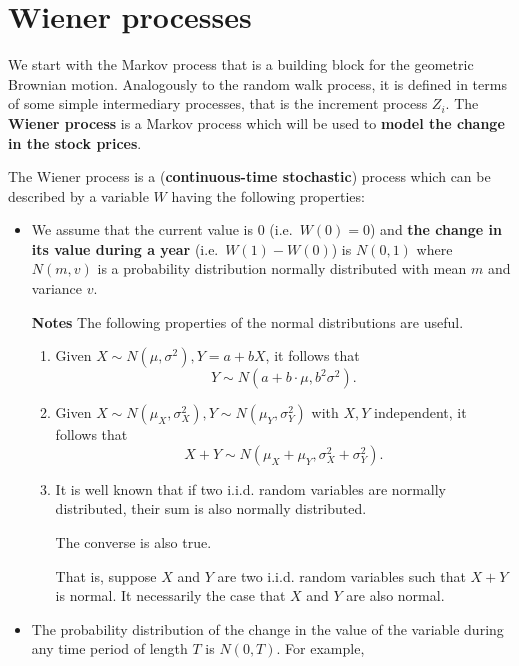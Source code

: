 \documentclass[
]{book}
\theoremstyle{definition}
\theoremstyle{definition}
\theoremstyle{definition}
\theoremstyle{definition}
\theoremstyle{remark}
\begin{document}
\hypertarget{wiener-processes}{%
\section{Wiener processes}\label{wiener-processes}}

We start with the Markov process that is a building block for the
geometric Brownian motion. Analogously to the random walk process, it is
defined in terms of some simple intermediary processes, that is the
increment process \(Z_i\). The \textbf{Wiener process} is a Markov process
which will be used to \textbf{model the change in the stock prices}.

The Wiener process is a (\textbf{continuous-time stochastic}) process which
can be described by a variable \(W\) having the following properties:

\begin{itemize}
\item
  We assume that the current value is 0 (i.e.~\(W(0) = 0\)) and \textbf{the
  change in its value during a year} (i.e.~\(W(1) - W(0)\)) is \(N(0,1)\)
  where \(N(m,v)\) is a probability distribution normally distributed
  with mean \(m\) and variance \(v\).

  \textbf{Notes} The following properties of the normal distributions are
  useful.

  \begin{enumerate}
  \def\labelenumi{\arabic{enumi}.}
  \item
    Given \(X \sim N(\mu, \sigma^2), Y = a + bX\), it follows that
    \[Y \sim N(a + b\cdot \mu, b^2 \sigma^2).\]
  \item
    Given \(X \sim N(\mu_X, \sigma_X^2), Y \sim N(\mu_Y, \sigma_Y^2)\)
    with \(X, Y\) independent, it follows that
    \[X + Y  \sim N(\mu_X + \mu_Y, \sigma_X^2 + \sigma_Y^2).\]
  \item
    It is well known that if two i.i.d. random variables are
    normally distributed, their sum is also normally distributed.

    The converse is also true.

    That is, suppose \(X\) and \(Y\) are two i.i.d. random variables
    such that \(X + Y\) is normal. It necessarily the case that \(X\)
    and \(Y\) are also normal.
  \end{enumerate}
\item
  The probability distribution of the change in the value of the
  variable during any time period of length \(T\) is \(N(0,T)\). For
  example,


\end{itemize}
\end{document}
